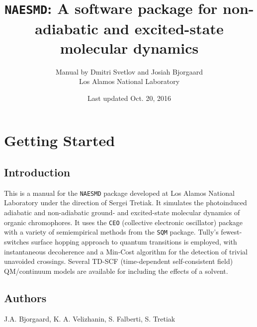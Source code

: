 \documentclass[12pt,letter,footinclude=true,headinclude=true,hyphens]{book} %
\begin{document}


\author{Manual by Dmitri Svetlov and Josiah Bjorgaard \\Los Alamos National Laboratory\\}
\date{Last updated Oct. 20, 2016}
\title{\texttt{NAESMD}: A software package for non-adiabatic and excited-state molecular dynamics}
	
	\maketitle
	
	\tableofcontents 


    \cleardoublepage\part{Getting Started}
    
    \chapter{Introduction}
    
    This is a manual for the \texttt{NAESMD} package developed at Los Alamos National Laboratory under the direction of Sergei Tretiak. It simulates the photoinduced adiabatic and non-adiabatic ground- and excited-state molecular dynamics of organic chromophores. It uses the \texttt{CEO} (collective electronic oscillator) package with a variety of semiempirical methods from the \texttt{SQM} package. Tully's fewest-switches surface hopping approach to quantum transitions is employed, with instantaneous decoherence and a Min-Cost algorithm for the detection of trivial unavoided crossings. Several TD-SCF (time-dependent self-consistent field) QM/continuum models are available for including the effects of a solvent.
    
    \chapter{Authors}
    
    J.A. Bjorgaard, K. A. Velizhanin, S. Falberti, S. Tretiak
    
\end{document}

